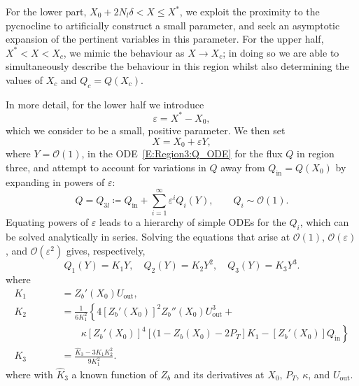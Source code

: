 \documentclass[openacc]{rsproca_new}%
\newcommand{\order}[1]{\mathcal{O}(#1)}
\newcommand{\lt}{\delta} %
\newcommand{\Pt}{\textit{P}_T}
\renewcommand{\in}{\text{in}} %
\newcommand{\out}{\text{out}}
\begin{document}
For the lower part, $X_0  + 2N_l \lt < X \leq X^*$, we exploit the proximity to the pycnocline to artificially construct a small parameter, and seek an asymptotic expansion of the pertinent variables in this parameter. For the upper half, $X^* < X < X_c$, we mimic the behaviour as $X \to X_c$; in doing so we are able to simultaneously describe the behaviour in this region whilst also determining the values of $X_c$ and $Q_c = Q(X_c)$.

In more detail, for the lower half we introduce 
\begin{equation}
\varepsilon = X^* - X_0,
\end{equation}
which we consider to be a small, positive parameter. We then set 
\begin{equation}
X = X_0 + \varepsilon Y,
\end{equation}
where  $Y = \order{1}$, in the ODE~\eqref{E:Region3:Q_ODE} for the flux $Q$ in region three, and attempt to account for variations in $Q$ away from $Q_{\text{in}} = Q(X_0)$ by expanding in powers of $\varepsilon$:
\begin{equation}\label{E:MeltRate:Q_expansionR3}
Q = Q_{3l} \coloneqq   Q_\in  + \sum_{i = 1}^{\infty} \varepsilon^i Q_i(Y), \qquad Q_i \sim \order{1}.
 \end{equation}
Equating powers of $\varepsilon$ leads to a hierarchy of simple ODEs for the $Q_i$, which can be solved analytically in series. Solving the equations that arise at $\order{1}$, $\order{\varepsilon}$, and $\order{\varepsilon^2}$ gives, respectively,
\begin{equation}
Q_1(Y) = K_1 Y, \quad Q_2(Y) = K_2 Y^2, \quad Q_3(Y) =K_3 Y^3.
\end{equation}
where
\begin{align}
K_1 &=  Z_b'(X_0) U_\out,\\
K_2 &= \frac{1}{6K_1^2}\left\{4\left[Z_b'(X_0)\right]^2 Z_b''(X_0)U_\out^3 \right. + \nonumber \\ \qquad \qquad &\left. \qquad  \kappa \left[Z_b'(X_0)\right]^4 \left[(1 - Z_b(X_0) - 2\Pt\right] K_1 - \left[Z_b'(X_0)\right] Q_\in\right\}\\
K_3 &= \frac{\hat{K}_3 - 3K_1 K_2^2}{9K_1^2}.
\end{align}
where
with $\hat{K}_3$ a known function of $Z_b$ and its derivatives at $X_0$, $P_T$, $\kappa$, and $U_\text{out}$.
\end{document}
